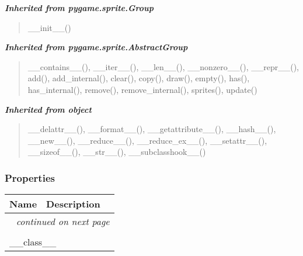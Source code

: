 \large{\textbf{\textit{Inherited from pygame.sprite.Group}}}

\begin{quote}
\_\_init\_\_()
\end{quote}

\large{\textbf{\textit{Inherited from pygame.sprite.AbstractGroup}}}

\begin{quote}
\_\_contains\_\_(), \_\_iter\_\_(), \_\_len\_\_(), \_\_nonzero\_\_(), \_\_repr\_\_(), add(), add\_internal(), clear(), copy(), draw(), empty(), has(), has\_internal(), remove(), remove\_internal(), sprites(), update()
\end{quote}

\large{\textbf{\textit{Inherited from object}}}

\begin{quote}
\_\_delattr\_\_(), \_\_format\_\_(), \_\_getattribute\_\_(), \_\_hash\_\_(), \_\_new\_\_(), \_\_reduce\_\_(), \_\_reduce\_ex\_\_(), \_\_setattr\_\_(), \_\_sizeof\_\_(), \_\_str\_\_(), \_\_subclasshook\_\_()
\end{quote}


  \subsubsection{Properties}

    \vspace{-1cm}
\hspace{\varindent}\begin{longtable}{|p{\varnamewidth}|p{\vardescrwidth}|l}
\cline{1-2}
\cline{1-2} \centering \textbf{Name} & \centering \textbf{Description}& \\
\cline{1-2}
\endhead\cline{1-2}\multicolumn{3}{r}{\small\textit{continued on next page}}\\\endfoot\cline{1-2}
\endlastfoot\multicolumn{2}{|l|}{\textit{Inherited from object}}\\
\multicolumn{2}{|p{\varwidth}|}{\raggedright \_\_class\_\_}\\
\cline{1-2}
\end{longtable}



